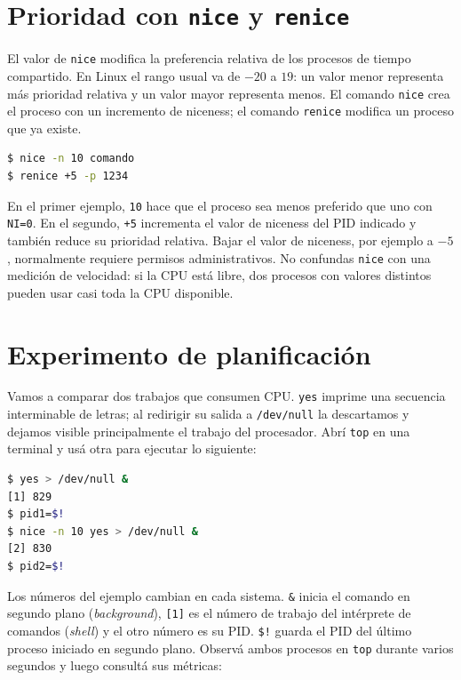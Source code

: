 \documentclass[11pt,a4paper]{article}
\begin{document}
\section{Prioridad con \texttt{nice} y \texttt{renice}}

El valor de \texttt{nice} modifica la preferencia relativa de los procesos de
tiempo compartido. En Linux el rango usual va de $-20$ a $19$: un valor menor
representa más prioridad relativa y un valor mayor representa menos. El
comando \texttt{nice} crea el proceso con un incremento de niceness; el
comando \texttt{renice} modifica un proceso que ya existe.

\begin{lstlisting}[language=bash]
$ nice -n 10 comando
$ renice +5 -p 1234
\end{lstlisting}

En el primer ejemplo, \texttt{10} hace que el proceso sea menos preferido que
uno con \texttt{NI=0}. En el segundo, \texttt{+5} incrementa el valor de
niceness del PID indicado y también reduce su prioridad relativa. Bajar el
valor de niceness, por ejemplo a $-5$, normalmente requiere permisos
administrativos. No confundas \texttt{nice} con una medición de velocidad: si
la CPU está libre, dos procesos con valores distintos pueden usar casi toda
la CPU disponible.

\section{Experimento de planificación}

Vamos a comparar dos trabajos que consumen CPU. \texttt{yes} imprime una
secuencia interminable de letras; al redirigir su salida a \texttt{/dev/null}
la descartamos y dejamos visible principalmente el trabajo del procesador.
Abrí \texttt{top} en una terminal y usá otra para ejecutar lo siguiente:

\begin{lstlisting}[language=bash]
$ yes > /dev/null &
[1] 829
$ pid1=$!
$ nice -n 10 yes > /dev/null &
[2] 830
$ pid2=$!
\end{lstlisting}

Los números del ejemplo cambian en cada sistema. \texttt{\&} inicia el
comando en segundo plano (\emph{background}), \texttt{[1]} es el número de
trabajo del intérprete de comandos (\emph{shell}) y el otro número es su PID.
\texttt{\$!} guarda el PID del último proceso iniciado en segundo plano.
Observá ambos procesos en \texttt{top} durante varios
segundos y luego consultá sus métricas:
\end{document}
